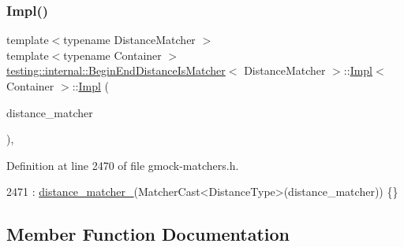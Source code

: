 \subsubsection{\texorpdfstring{Impl()}{Impl()}}
{\footnotesize\ttfamily template$<$typename Distance\+Matcher $>$ \\
template$<$typename Container $>$ \\
\hyperlink{classtesting_1_1internal_1_1BeginEndDistanceIsMatcher}{testing\+::internal\+::\+Begin\+End\+Distance\+Is\+Matcher}$<$ Distance\+Matcher $>$\+::\hyperlink{classtesting_1_1internal_1_1BeginEndDistanceIsMatcher_1_1Impl}{Impl}$<$ Container $>$\+::\hyperlink{classtesting_1_1internal_1_1BeginEndDistanceIsMatcher_1_1Impl}{Impl} (\begin{DoxyParamCaption}\item[{const Distance\+Matcher \&}]{distance\+\_\+matcher }\end{DoxyParamCaption})\hspace{0.3cm}{\ttfamily [inline]}, {\ttfamily [explicit]}}



Definition at line 2470 of file gmock-\/matchers.\+h.


\begin{DoxyCode}
2471         : \hyperlink{classtesting_1_1internal_1_1BeginEndDistanceIsMatcher_1_1Impl_acc8d923e6901fa9c75bf76825b2baa6b}{distance\_matcher\_}(MatcherCast<DistanceType>(distance\_matcher)) \{\}
\end{DoxyCode}


\subsection{Member Function Documentation}
\mbox{\label{classtesting_1_1internal_1_1BeginEndDistanceIsMatcher_1_1Impl_a359711f21b6f116a5233fca78736fa47}} 

